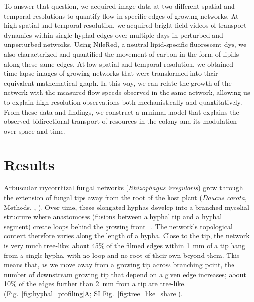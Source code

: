 To answer that question, we acquired image data at two different spatial and temporal resolutions to quantify flow in specific edges of growing networks.
At high spatial and temporal resolution, we acquired bright-field videos of transport dynamics within single hyphal edges over multiple days in perturbed and unperturbed networks.
Using NileRed, a neutral lipid-specific fluorescent dye, we also characterized and quantified the movement of carbon in the form of lipids along these same edges.
At low spatial and temporal resolution, we obtained time-lapse images of growing networks that were transformed into their equivalent mathematical graph.
In this way, we can relate the growth of the network with the measured flow speeds observed in the same network, allowing us to explain high-resolution observations both mechanistically and quantitatively.
From these data and findings, we construct a minimal model that explains the observed bidirectional transport of resources in the colony and its modulation over space and time.

\section*{Results}

Arbuscular mycorrhizal fungal networks (\textit{Rhizophagus irregularis}) grow through the extension of fungal tips away from the root of the host plant (\textit{Daucus carota}, Methods, , \cite{oyarte_galvez_travelling-wave_2025}).
Over time, these elongated hyphae develop into a branched mycelial structure where anastomoses (fusions between a hyphal tip and a hyphal segment) create loops behind the growing front ~\cite{oyarte_galvez_travelling-wave_2025}.
The network's topological context therefore varies along the length of a hypha. Close to the tip, the network is very much tree-like: about 45\% of the filmed edges within 1~mm of a tip hang from a single hypha, with no loop and no root of their own beyond them. This means that, as we move away from a growing tip across branching point, the number of downstream growing tip that depend on a given edge increases; about 10\% of the edges further than 2~mm from a tip are tree-like. (Fig.~\ref{fig:hyphal_profiling}A; SI Fig.~\ref{fig:tree_like_share}).



